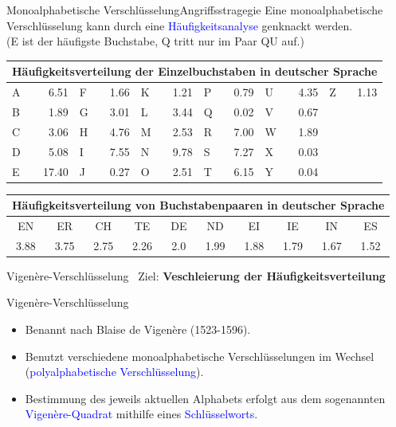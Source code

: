 \documentclass{beamer}
\newcommand{\tb}[1]{{\textcolor{blue}{#1}}}
\theoremstyle{plain}
\begin{document}
\begin{frame}{Monoalphabetische Verschlüsselung}{Angriffsstragegie}
 Eine monoalphabetische Verschlüsselung kann durch eine \tb{Häufigkeitsanalyse} genknackt werden.\\
 (E ist der häufigste Buchstabe, Q tritt nur im Paar QU auf.) 
 \vspace{0.5cm}
 \begin{center}
 \footnotesize{
 \begin{tabular}{|l r|l r|l r|l r|l r|l r|}
  \hline
  \multicolumn{12}{|c|}{Häufigkeitsverteilung der Einzelbuchstaben in deutscher Sprache}\\
  \hline
  \hline
  A & 6.51 & F & 1.66 & K & 1.21 & P & 0.79 & U & 4.35 & Z & 1.13 \\
  B & 1.89 & G & 3.01 & L & 3.44 & Q & 0.02 & V & 0.67 & & \\
  C & 3.06 & H & 4.76 & M & 2.53 & R & 7.00 & W & 1.89 & & \\
  D & 5.08 & I & 7.55 & N & 9.78 & S & 7.27 & X & 0.03 & & \\
  E & 17.40& J & 0.27 & O & 2.51 & T & 6.15 & Y & 0.04 & & \\
  \hline
 \end{tabular}
 
 \vspace{0.5cm}
 \begin{tabular}{|c|c|c|c|c|c|c|c|c|c|}
 \hline
 \multicolumn{10}{|c|}{Häufigkeitsverteilung von Buchstabenpaaren in deutscher Sprache}\\
  \hline 
  \hline
  EN & ER & CH & TE & DE & ND & EI & IE & IN & ES \\
  \hline
  3.88 & 3.75 & 2.75 & 2.26 & 2.0 & 1.99 & 1.88 & 1.79 & 1.67 & 1.52 \\
  \hline
 \end{tabular}
 }
 \end{center}
 
\end{frame}

\begin{frame}{Vigenère-Verschlüsselung}{~}
 Ziel: \textbf{Veschleierung der Häufigkeitsverteilung} \pause
 
 \begin{block}{Vigenère-Verschlüsselung}{~}
  \begin{itemize}
   \item Benannt nach Blaise de Vigenère (1523-1596).
   \item Benutzt verschiedene monoalphabetische Verschlüsselungen im Wechsel (\tb{polyalphabetische Verschlüsselung}).
   \item Bestimmung des jeweils aktuellen Alphabets erfolgt aus dem sogenannten \tb{Vigenère-Quadrat} mithilfe eines \tb{Schlüsselworts}. 
  \end{itemize}

 \end{block}
\end{frame}
\end{document}
